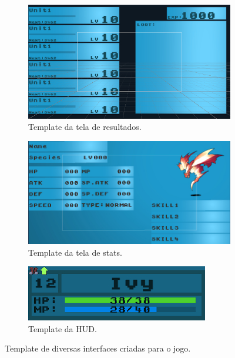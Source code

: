 \documentclass[
	12pt,				%
	openright,			%
	twoside,			%
	a4paper,			%
	english,			%
	french,				%
	spanish,			%
	brazil				%
	]{abntex2}
\begin{document}
\begin{figure}[h!]
  \centering
  \begin{subfigure}[b]{0.55\linewidth}
    \includegraphics[width=\linewidth]{resultstemplate.jpg}
     \caption{Template da tela de resultados.}
  \end{subfigure}
  \begin{subfigure}[b]{0.55\linewidth}
    \includegraphics[width=\linewidth]{statstemplate.jpg}
    \caption{Template da tela de stats.}
  \end{subfigure}
  \begin{subfigure}[b]{0.3\linewidth}
    \includegraphics[width=\linewidth]{hudtemplate.jpg}
    \caption{Template da HUD.}
  \end{subfigure}
  \caption{Template de diversas interfaces criadas para o jogo.}
  \label{fig:interfaces}
\end{figure}
\end{document}
